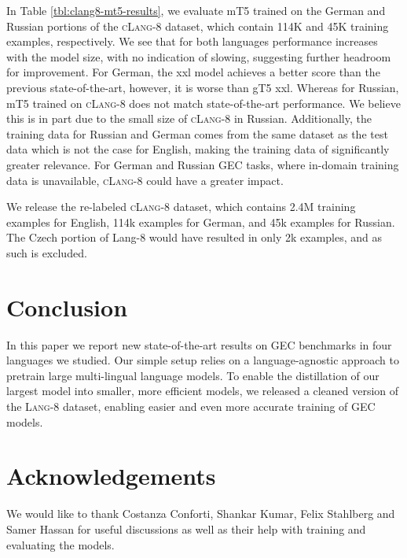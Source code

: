 \documentclass[11pt,a4paper]{article}
\newcommand{\GT}[0]{{gT5}\xspace}
\newcommand{\lang}[0]{{\scshape Lang-8}\xspace}
\newcommand{\clangg}[0]{{\scshape cLang-8}\xspace}
\begin{document}
In Table \ref{tbl:clang8-mt5-results}, we evaluate mT5 trained on the German and Russian portions of the \clangg dataset, which contain 114K and 45K training examples, respectively. We see that for both languages performance increases with the model size, with no indication of slowing, suggesting further headroom for improvement. For German, the xxl model achieves a better score than the previous state-of-the-art, however, it is worse than \GT xxl. Whereas for Russian, mT5 trained on \clangg does not match state-of-the-art performance. We believe this is in part due to the small size of \clangg in Russian. Additionally, the training data for Russian and German comes from the same dataset as the test data which is not the case for English, making the training data of significantly greater relevance. For German and Russian GEC tasks, where in-domain training data is unavailable, \clangg could have a greater impact.

We release the re-labeled \clangg dataset, which contains 2.4M training examples for English, 114k examples for German, and 45k examples for Russian. The Czech portion of Lang-8 would have resulted in only 2k examples, and as such is excluded.

\section{Conclusion}
In this paper we report new state-of-the-art results on GEC benchmarks in four languages we studied. Our simple setup relies on a language-agnostic approach to pretrain large multi-lingual language models. To enable the distillation of our largest model into smaller, more efficient models, we released a cleaned version of the \lang dataset, enabling easier and even more accurate training of GEC models.

\section*{Acknowledgements}

We would like to thank Costanza Conforti, Shankar Kumar, Felix Stahlberg and Samer Hassan for useful discussions as well as their help with training and evaluating the models.



\end{document}
